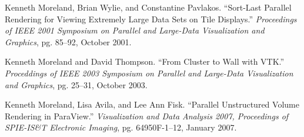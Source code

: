 \begin{reflist}
\item Kenneth Moreland, Brian Wylie, and Constantine Pavlakos.  ``Sort-Last
  Parallel Rendering for Viewing Extremely Large Data Sets on Tile
  Displays.''  \emph{Proceedings of IEEE 2001 Symposium on Parallel and
    Large-Data Visualization and Graphics}, pg. 85–92, October 2001.
\item Kenneth Moreland and David Thompson.  ``From Cluster to Wall with
  VTK.''  \emph{Proceddings of IEEE 2003 Symposium on Parallel and
    Large-Data Visualization and Graphics}, pg. 25–31, October 2003.
\item Kenneth Moreland, Lisa Avila, and Lee Ann Fisk.  ``Parallel
  Unstructured Volume Rendering in ParaView.''  \emph{Visualization and Data
  Analysis 2007, Proceedings of SPIE-IS\&T Electronic Imaging},
  pg. 64950F-1–12, January 2007.
\end{reflist}


